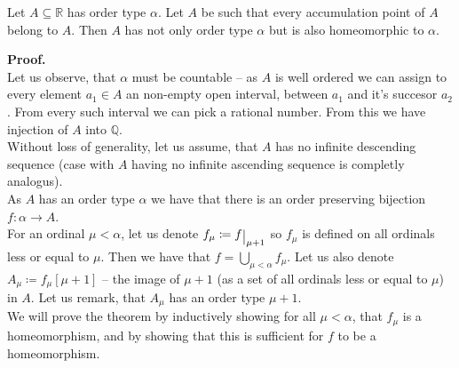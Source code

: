 \begin{theorem}\label{order_preserving_homeomorphism_theorem}
Let $A \subseteq \mathbb{R}$ has order type $\alpha$. 
Let $A$ be such that every accumulation point of $A$ belong to $A$. Then $A$ has not only 
order type $\alpha$ but is also homeomorphic to $\alpha$. 
\end{theorem}

\textbf{Proof.} \\
Let us observe, that $\alpha$ must be countable -- as $A$ is well ordered we can assign to every 
element $a_1 \in A$ an non-empty open interval, between $a_1$ and it's succesor $a_2$. 
From every such interval we can pick a rational number. From this we have injection of $A$ into 
$\mathbb{Q}$. \\
Without loss of generality, let us assume, that $A$ has no infinite descending sequence 
(case with $A$ having no infinite ascending sequence is completly analogus). \\

As $A$ has an order type $\alpha$ we have that there is an order preserving bijection 
$f : \alpha \to A$. \\
For an ordinal $\mu < \alpha$, let us denote $f_\mu 
\coloneqq f\raisebox{-0.5\depth}{\big|}_{\mu + 1}$ so 
$f_\mu$ is defined on all ordinals less or equal to $\mu$. Then we have that
$f = \bigcup\limits_{\mu < \alpha} f_\mu$. Let us also denote $A_\mu \coloneqq f_\mu[\mu+1]$ --
the image of $\mu + 1$ (as a set of all ordinals less or equal to $\mu$) in $A$. 
Let us remark, that $A_\mu$ has an order type $\mu + 1$.\\ 

We will prove the theorem by inductively showing for all $\mu < \alpha$, that $f_\mu$ is a 
homeomorphism, and by showing that this is sufficient for $f$ to be a homeomorphism. \\



